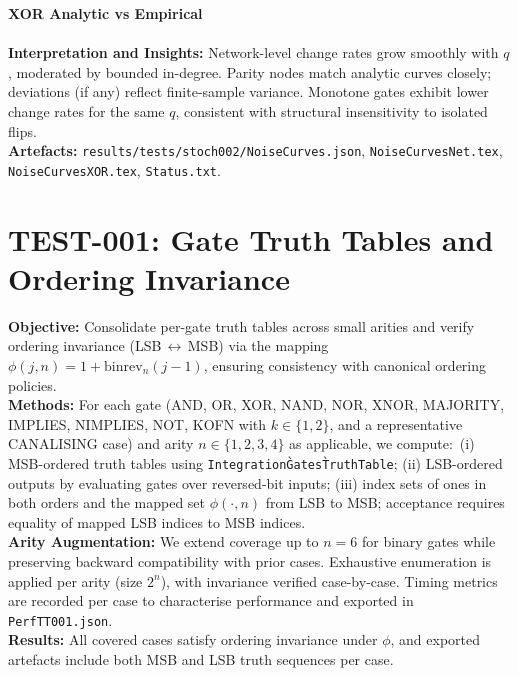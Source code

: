 \documentclass[11pt]{article}
\begin{document}
\textbf{XOR Analytic vs Empirical}\\
\\
\textbf{Interpretation and Insights:} Network-level change rates grow smoothly with \(q\), moderated by bounded in-degree. Parity nodes match analytic curves closely; deviations (if any) reflect finite-sample variance. Monotone gates exhibit lower change rates for the same \(q\), consistent with structural insensitivity to isolated flips.\\
\textbf{Artefacts:} \texttt{results/tests/stoch002/NoiseCurves.json}, \texttt{NoiseCurvesNet.tex}, \texttt{NoiseCurvesXOR.tex}, \texttt{Status.txt}.


\section{TEST-001: Gate Truth Tables and Ordering Invariance}
\textbf{Objective:} Consolidate per-gate truth tables across small arities and verify ordering invariance (LSB\,$\leftrightarrow$\,MSB) via the mapping $\phi(j,n)=1+\mathrm{binrev}_n(j-1)$, ensuring consistency with canonical ordering policies.\\
\textbf{Methods:} For each gate (AND, OR, XOR, NAND, NOR, XNOR, MAJORITY, IMPLIES, NIMPLIES, NOT, KOFN with $k\in\{1,2\}$, and a representative CANALISING case) and arity $n\in\{1,2,3,4\}$ as applicable, we compute:\
(i) MSB-ordered truth tables using \texttt{Integration\`Gates\`TruthTable}; (ii) LSB-ordered outputs by evaluating gates over reversed-bit inputs; (iii) index sets of ones in both orders and the mapped set $\phi(\cdot,n)$ from LSB to MSB; acceptance requires equality of mapped LSB indices to MSB indices.\\
\textbf{Arity Augmentation:} We extend coverage up to $n=6$ for binary gates while preserving backward compatibility with prior cases. Exhaustive enumeration is applied per arity (size $2^n$), with invariance verified case-by-case. Timing metrics are recorded per case to characterise performance and exported in \texttt{PerfTT001.json}.\\
\textbf{Results:} All covered cases satisfy ordering invariance under $\phi$, and exported artefacts include both MSB and LSB truth sequences per case.\\
\end{document}
